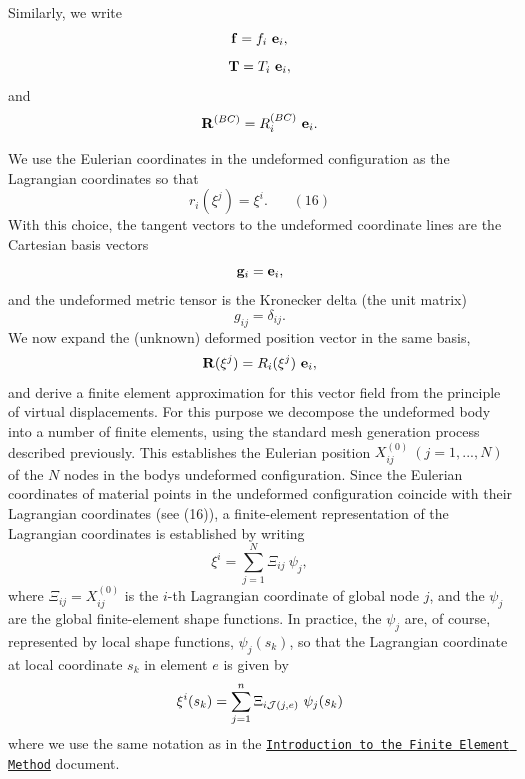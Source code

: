 Similarly, we write \[ {\bf f} = f_i \ {\bf e}_i, \] \[ {\bf T} = T_i \ {\bf e}_i, \] and \[ {\bf R}^{(BC)} = R^{(BC)}_i \ {\bf e}_i. \]

We use the Eulerian coordinates in the undeformed configuration as the Lagrangian coordinates so that \[ r_i(\xi^j) = \xi^i. \ \ \ \ \ \ \ \ (16) \] With this choice, the tangent vectors to the undeformed coordinate lines are the Cartesian basis vectors \[ {\bf g}_i = {\bf e}_i, \] and the undeformed metric tensor is the Kronecker delta (the unit matrix) \[ g_{ij} = \delta_{ij}. \] We now expand the (unknown) deformed position vector in the same basis, \[ {\bf R}(\xi^j) = R_i(\xi^j) \ {\bf e}_i, \] and derive a finite element approximation for this vector field from the principle of virtual displacements. For this purpose we decompose the undeformed body into a number of finite elements, using the standard mesh generation process described previously. This establishes the Eulerian position $ X_{ij}^{(0)} \ (j=1,...,N) $ of the $ N $ nodes in the body\textquotesingle{}s undeformed configuration. Since the Eulerian coordinates of material points in the undeformed configuration coincide with their Lagrangian coordinates (see (16)), a finite-\/element representation of the Lagrangian coordinates is established by writing \[ \xi^i = \sum_{j=1}^{N} \Xi_{ij} \ \psi_j, \] where $ \Xi_{ij} = X_{ij}^{(0)} $ is the $i$-\/th Lagrangian coordinate of global node $j$, and the $\psi_j$ are the global finite-\/element shape functions. In practice, the $\psi_j$ are, of course, represented by local shape functions, $\psi_j(s_k)$, so that the Lagrangian coordinate at local coordinate $ s_k $ in element $ e $ is given by \[ \xi^i(s_k) = \sum_{j=1}^{n} \Xi_{i{\cal J}(j,e)} \ \psi_j(s_k) \] where we use the same notation as in the \href{../../../intro/html/index.html}{\tt Introduction to the Finite Element Method} document.

